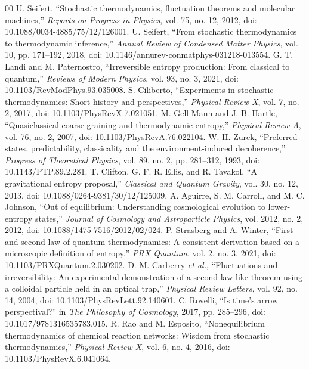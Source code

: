 \begin{thebibliography}{00}
 U. Seifert, ``Stochastic thermodynamics, fluctuation theorems and molecular machines,'' \emph{Reports on Progress in Physics}, vol. 75, no. 12, 2012, doi: 10.1088/0034-4885/75/12/126001.
 U. Seifert, ``From stochastic thermodynamics to thermodynamic inference,'' \emph{Annual Review of Condensed Matter Physics}, vol. 10, pp. 171--192, 2018, doi: 10.1146/annurev-conmatphys-031218-013554.
 G. T. Landi and M. Paternostro, ``Irreversible entropy production: From classical to quantum,'' \emph{Reviews of Modern Physics}, vol. 93, no. 3, 2021, doi: 10.1103/RevModPhys.93.035008.
 S. Ciliberto, ``Experiments in stochastic thermodynamics: Short history and perspectives,'' \emph{Physical Review X}, vol. 7, no. 2, 2017, doi: 10.1103/PhysRevX.7.021051.
 M. Gell-Mann and J. B. Hartle, ``Quasiclassical coarse graining and thermodynamic entropy,'' \emph{Physical Review A}, vol. 76, no. 2, 2007, doi: 10.1103/PhysRevA.76.022104.
 W. H. Zurek, ``Preferred states, predictability, classicality and the environment-induced decoherence,'' \emph{Progress of Theoretical Physics}, vol. 89, no. 2, pp. 281--312, 1993, doi: 10.1143/PTP.89.2.281.
 T. Clifton, G. F. R. Ellis, and R. Tavakol, ``A gravitational entropy proposal,'' \emph{Classical and Quantum Gravity}, vol. 30, no. 12, 2013, doi: 10.1088/0264-9381/30/12/125009.
 A. Aguirre, S. M. Carroll, and M. C. Johnson, ``Out of equilibrium: Understanding cosmological evolution to lower-entropy states,'' \emph{Journal of Cosmology and Astroparticle Physics}, vol. 2012, no. 2, 2012, doi: 10.1088/1475-7516/2012/02/024.
 P. Strasberg and A. Winter, ``First and second law of quantum thermodynamics: A consistent derivation based on a microscopic definition of entropy,'' \emph{PRX Quantum}, vol. 2, no. 3, 2021, doi: 10.1103/PRXQuantum.2.030202.
 D. M. Carberry \emph{et al.}, ``Fluctuations and irreversibility: An experimental demonstration of a second-law-like theorem using a colloidal particle held in an optical trap,'' \emph{Physical Review Letters}, vol. 92, no. 14, 2004, doi: 10.1103/PhysRevLett.92.140601.
 C. Rovelli, ``Is time's arrow perspectival?'' in \emph{The Philosophy of Cosmology}, 2017, pp. 285--296, doi: 10.1017/9781316535783.015.
 R. Rao and M. Esposito, ``Nonequilibrium thermodynamics of chemical reaction networks: Wisdom from stochastic thermodynamics,'' \emph{Physical Review X}, vol. 6, no. 4, 2016, doi: 10.1103/PhysRevX.6.041064.
\end{thebibliography}
